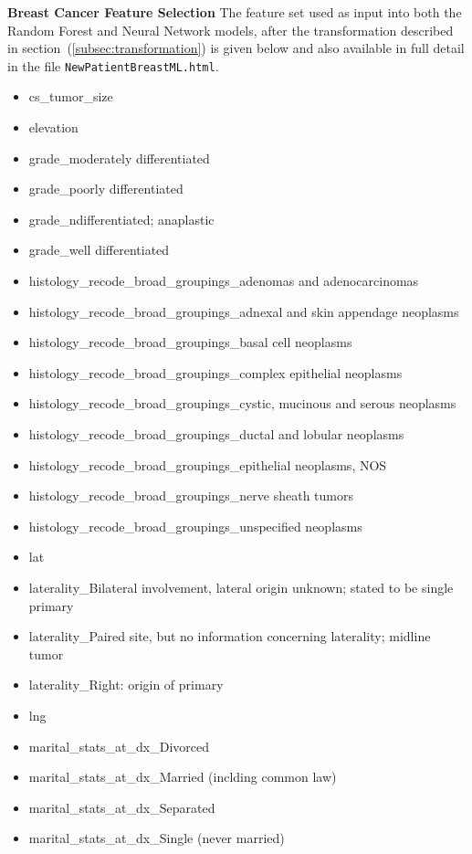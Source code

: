 \documentclass[10pt,letterpaper]{article}
\newcommand{\codewhite}[1]{\colorbox{white}{\texttt{#1}}}
\begin{document}
{\bf Breast Cancer Feature Selection} The feature set used as input into both the Random Forest and Neural Network models, after the transformation described in section~(\ref{subsec:transformation}) is given below and also available in full detail in the file 
\codewhite{NewPatientBreastML.html}.

\begin{itemize}[noitemsep]
\item cs\_tumor\_size
\item elevation
\item grade\_moderately differentiated
\item grade\_poorly differentiated
\item grade\_ndifferentiated; anaplastic
\item grade\_well differentiated
\item histology\_recode\_broad\_groupings\_adenomas and adenocarcinomas
\item histology\_recode\_broad\_groupings\_adnexal and skin appendage neoplasms
\item histology\_recode\_broad\_groupings\_basal cell neoplasms
\item histology\_recode\_broad\_groupings\_complex epithelial neoplasms
\item histology\_recode\_broad\_groupings\_cystic, mucinous and serous neoplasms
\item histology\_recode\_broad\_groupings\_ductal and lobular neoplasms
\item histology\_recode\_broad\_groupings\_epithelial neoplasms, NOS
\item histology\_recode\_broad\_groupings\_nerve sheath tumors
\item histology\_recode\_broad\_groupings\_unspecified neoplasms
\item lat
\item laterality\_Bilateral involvement, lateral origin unknown; stated to be single primary
\item laterality\_Paired site, but no information concerning laterality; midline tumor
\item laterality\_Right: origin of primary
\item lng
\item marital\_stats\_at\_dx\_Divorced
\item marital\_stats\_at\_dx\_Married (inclding common law)
\item marital\_stats\_at\_dx\_Separated
\item marital\_stats\_at\_dx\_Single (never married)

\end{itemize}
\end{document}
